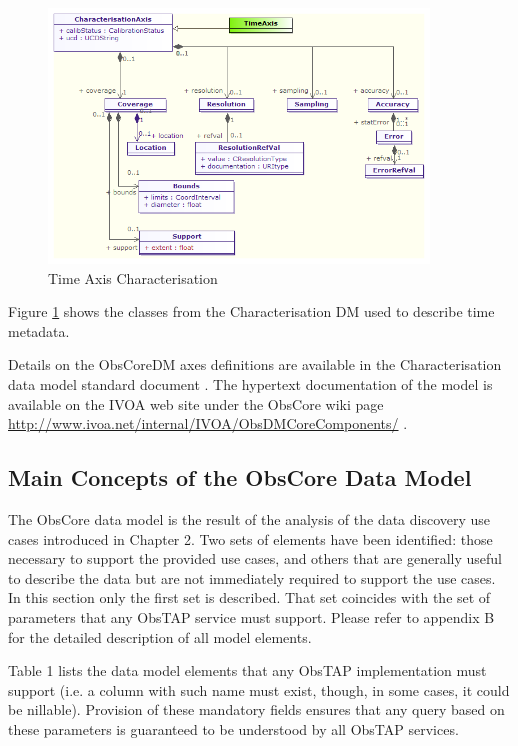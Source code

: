 \documentclass[11pt,a4paper]{ivoa}
\begin{document}
\begin{figure}[H]
\centering
\includegraphics[width=0.9\textwidth]{Char-Time.png}
\caption{Time Axis Characterisation}
\label{fig:char-time}
\end{figure}
Figure \ref{fig:char-time} shows the classes from the Characterisation DM used to
describe time metadata.

Details on the ObsCoreDM axes definitions are available in the Characterisation data model standard document
\citep{2008ivoa.spec.0325L}. The hypertext documentation of the model is available on the IVOA web site under the
ObsCore wiki page  \url{http://www.ivoa.net/internal/IVOA/ObsDMCoreComponents/} .

\subsection[Main Concepts of the ObsCore Data Model]{Main Concepts of the ObsCore Data Model}
The ObsCore data model is the result of the analysis of the data discovery use cases introduced in Chapter 2. Two sets
of elements have been identified: those necessary to support the provided use cases, and others that are generally
useful to describe the data but are not immediately required to support the use cases.  In this section only the first
set is described.  That set coincides with the set of parameters that any ObsTAP service must support. Please refer to
appendix B for the detailed description of all model elements. 

Table 1 lists the data model elements that any ObsTAP implementation must support (i.e. a column with such name must
exist, though, in some cases, it could be nillable).  Provision of these mandatory fields ensures that any query based
on these parameters is guaranteed to be understood by all ObsTAP services.
\end{document}
